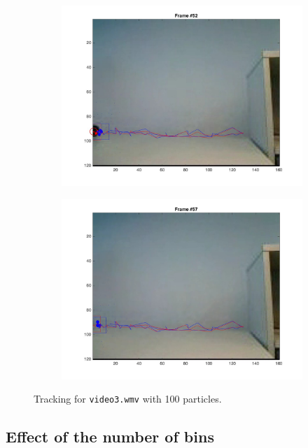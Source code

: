 \documentclass{ethz_report}
\begin{document}
\begin{figure}[h]
\begin{subfigure}[b]{.25\textwidth}
        \includegraphics[width=1\linewidth]{images/video3_particles_low_51}
    \end{subfigure}%
    \begin{subfigure}[b]{.25\textwidth}
        \centering
        \includegraphics[width=1\linewidth]{images/video3_particles_low_56}
    \end{subfigure}
    \caption{Tracking for \texttt{video3.wmv} with 100 particles.}
    \label{fig:tracking_video3_particles_low}
\end{figure}

\subsection*{Effect of the number of bins}
\end{document}
